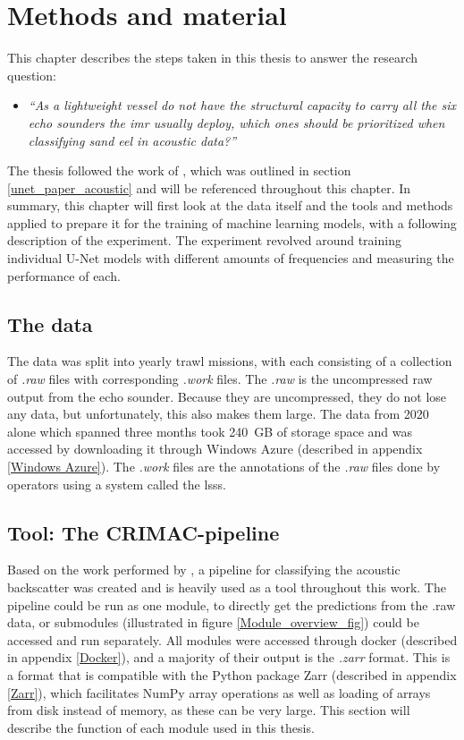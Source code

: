 \chapter{Methods and material}
    This chapter describes the steps taken in this thesis to answer the research question:
        \begin{itemize}
            \item \textit{“As a lightweight vessel do not have the structural capacity to carry all the six echo sounders the \gls{imr} usually deploy, which ones should be prioritized when classifying sand eel in acoustic data?”}
        \end{itemize}
    
    The thesis followed the work of \citeauthor{brautaset2020acoustic}\cite{brautaset2020acoustic}, which was outlined in section \ref{unet_paper_acoustic} and will be referenced throughout this chapter. In summary, this chapter will first look at the data itself and the tools and methods applied to prepare it for the training of machine learning models, with a following description of the experiment. The experiment revolved around training individual U-Net models with different amounts of frequencies and measuring the performance of each.
    
    \section{The data}
        The data was split into yearly trawl missions, with each consisting of a collection of \textit{.raw} files with corresponding \textit{.work} files. The \textit{.raw} is the uncompressed raw output from the echo sounder. Because they are uncompressed, they do not lose any data, but unfortunately, this also makes them large. The data from 2020 alone which spanned three months took 240 GB of storage space and was accessed by downloading it through Windows Azure (described in appendix \ref{Windows Azure}). The \textit{.work} files are the annotations of the \textit{.raw} files done by operators using a system called the \Gls{lsss}\cite{lsss}. 
    
    \section{Tool: The CRIMAC-pipeline}
        Based on the work performed by \citeauthor{brautaset2020acoustic}\cite{brautaset2020acoustic}, a pipeline for classifying the acoustic backscatter was created\cite{crimac_pipeline} and is heavily used as a tool throughout this work. The pipeline could be run as one module, to directly get the predictions from the .raw data, or submodules (illustrated in figure \ref{Module_overview_fig}) could be accessed and run separately. All modules were accessed through docker (described in appendix \ref{Docker}), and a majority of their output is the \textit{.zarr} format. This is a format that is compatible with the Python package Zarr (described in appendix \ref{Zarr}), which facilitates NumPy array operations as well as loading of arrays from disk instead of memory, as these can be very large. This section will describe the function of each module used in this thesis.
        
